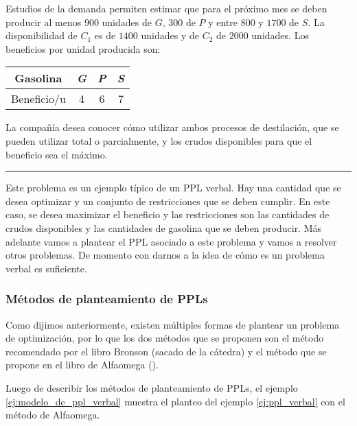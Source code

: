 Estudios de la demanda permiten estimar que para el próximo mes se deben producir al menos \(900\) unidades de \(G\), \(300\) de \(P\) y entre \(800\) y \(1700\) de \(S\). La disponibilidad de \(C_1\) es de \(1400\) unidades y de \(C_2\) de \(2000\) unidades. Los beneficios por unidad producida son:
\begin{table}[ht]
  \centering
  \begin{tabular}{|c|c|c|c|}
  \hline
  Gasolina & \textit{G} & \textit{P} & \textit{S} \\ \hline
  Beneficio/u & 4 & 6 & 7 \\ \hline
  \end{tabular}
\end{table}

La compañía desea conocer cómo utilizar ambos procesos de destilación, que se pueden utilizar total o parcialmente, y los crudos disponibles para que el beneficio sea el máximo.

\vspace{5mm}
\hrule
\vspace{5mm}

Este problema es un ejemplo típico de un PPL verbal. Hay una cantidad que se desea optimizar y un conjunto de restricciones que se deben cumplir. En este caso, se desea maximizar el beneficio y las restricciones son las cantidades de crudos disponibles y las cantidades de gasolina que se deben producir. Más adelante vamos a plantear el PPL asociado a este problema y vamos a resolver otros problemas. De momento con darnos a la idea de cómo es un problema verbal es suficiente.

\subsubsection{Métodos de planteamiento de PPLs}

Como dijimos anteriormente, existen múltiples formas de plantear un problema de optimización, por lo que los dos métodos que se proponen son el método recomendado por el libro Bronson (sacado de la cátedra) y el método que se propone en el libro de Alfaomega (\cite{PPL_Alfaomega}). 

Luego de describir los métodos de planteamiento de PPLs, el ejemplo \ref{ej:modelo_de_ppl_verbal} muestra el planteo del ejemplo \ref{ej:ppl_verbal} con el método de Alfaomega.

